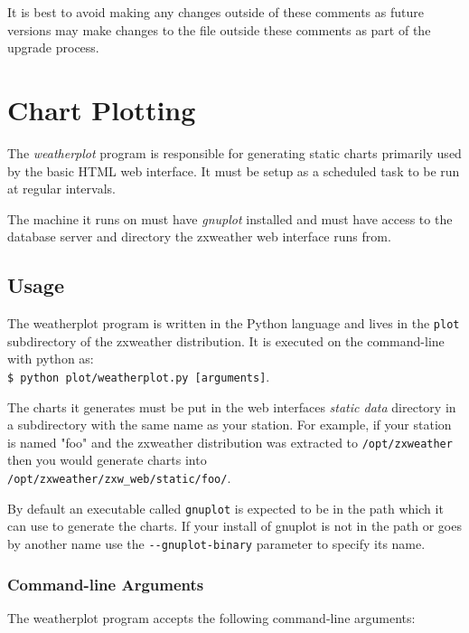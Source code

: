 \documentclass[a4paper,10pt,draft]{book}
\begin{document}
It is best to avoid making any changes outside of these comments as future versions may make changes to the file outside these comments as part of the upgrade process.


\section{Chart Plotting}
\label{sec_chart_plotting}

The \emph{weatherplot} program is responsible for generating static charts primarily used by the basic HTML web interface. It must be setup as a scheduled task to be run at regular intervals.

The machine it runs on must have \emph{gnuplot} installed and must have access to the database server and directory the zxweather web interface runs from.

\subsection{Usage}

The weatherplot program is written in the Python language and lives in the \verb|plot| subdirectory of the zxweather distribution. It is executed on the command-line with python as: \\ \verb|$ python plot/weatherplot.py [arguments]|.

The charts it generates must be put in the web interfaces \emph{static data} directory in a subdirectory with the same name as your station. For example, if your station is named "foo" and the zxweather distribution was extracted to \verb|/opt/zxweather| then you would generate charts into \\ \verb|/opt/zxweather/zxw_web/static/foo/|.

By default an executable called \verb|gnuplot| is expected to be in the path which it can use to generate the charts. If your install of gnuplot is not in the path or goes by another name use the \verb|--gnuplot-binary| parameter to specify its name.

\subsubsection{Command-line Arguments}
The weatherplot program accepts the following command-line arguments:
\end{document}
